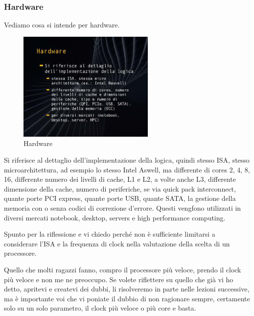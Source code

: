 \subsubsection{Hardware}

Vediamo cosa si intende per hardware.

\FloatBarrier
\begin{figure}[H]
  \centering
  \includegraphics[width=0.6\textwidth,
                    trim=40 40 15 40, %
                    clip]{images/Lez02_p04_fig_05.png}
  \caption{Hardware}
  \label{fig:Lez02_p04_fig_05}
\end{figure}
\FloatBarrier
\noindent

Si riferisce al dettaglio dell'implementazione della logica, quindi stesso ISA, stesso microarchitettura, ad esempio lo stesso Intel Aswell, ma differente di cores 2, 4, 8, 16, differente numero dei livelli di cache, L1 e L2, a volte anche L3, differente dimensione della cache, numero di periferiche, se via quick pack interconnect, quante porte PCI express, quante porte USB, quante SATA, la gestione della memoria con o senza codici di correzione d'errore.
Questi vengfono utilizzati in diversi mercati notebook, desktop, servers e high performance computing.

Spunto per la riflessione e vi chiedo perché non è sufficiente limitarsi a considerare l'ISA e la frequenza di clock nella valutazione della scelta di un processore.

Quello che molti ragazzi fanno, compro il processore più veloce, prendo il clock più veloce e non me ne preoccupo.
Se volete riflettere su quello che già vi ho detto, apritevi e createvi dei dubbi, li risolveremo in parte nelle lezioni successive, ma è importante voi che vi poniate il dubbio di non ragionare sempre, certamente solo su un solo parametro, il clock più veloce o più core e basta.